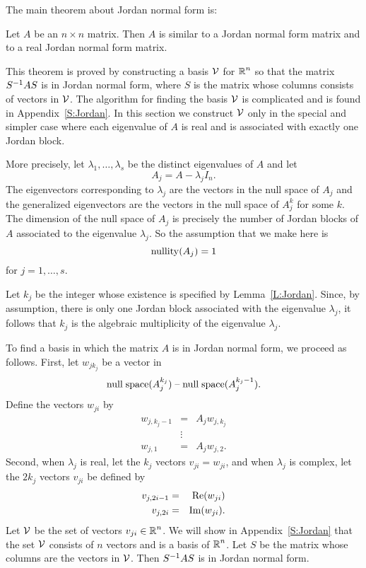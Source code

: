 \documentclass{ximera}
\begin{document}
The main theorem about Jordan normal form is:
\begin{theorem} \label{T:Jordan}
Let $A$ be an $n\times n$ matrix.  Then $A$ is 
similar to a Jordan normal
form matrix and to a real Jordan normal form matrix.
\end{theorem}

This theorem is proved by constructing a basis ${\cal V}$ for $\mbox{$\Bbb{R}$}^n$ so 
that the matrix $S^{-1} AS$ is in Jordan normal form, where $S$ is the
matrix whose columns consists of vectors in ${\cal V}$.  The algorithm for 
finding the basis ${\cal V}$ is complicated and is found in 
Appendix~\ref{S:Jordan}.  In this section we construct ${\cal V}$ only in the 
special and simpler case where each eigenvalue of $A$ is real and is 
associated with exactly one Jordan block.

More precisely, let $\lambda_1,\ldots,\lambda_s$ be the distinct 
eigenvalues of $A$ and let 
\[
A_j = A-\lambda_jI_n.
\]   
The eigenvectors corresponding to $\lambda_j$ are the vectors in the
null space of $A_j$ and the 
generalized eigenvectors are the vectors in 
the null space of $A_j^k$ for some $k$.  The dimension of the null space 
of $A_j$ is precisely the number of Jordan blocks 
of $A$ associated to 
the eigenvalue $\lambda_j$.  So the assumption that we make here is 
\[
{\rm nullity}(A_j) = 1
\]
for $j = 1,\ldots,s$.

Let $k_j$ be the integer whose existence is specified by
Lemma~\ref{L:Jordan}.  Since, by assumption, there is only one Jordan block
associated with the eigenvalue $\lambda_j$, it follows that $k_j$ is the
algebraic multiplicity of the eigenvalue $\lambda_j$.

To find a basis in which the matrix $A$ is in Jordan normal 
form, we proceed as follows.  First, let 
$w_{jk_j}$ be a vector in 
\[
{\rm null\;space}(A_j^{k_j})\;\mbox{--}\;{\rm null\;space}(A_j^{k_j-1}).  
\]  
Define the vectors $w_{ji}$ by 
\begin{eqnarray*}
w_{j,k_j-1} & = & A_jw_{j,k_j} \\
& \vdots &  \\
w_{j,1} & = & A_jw_{j,2}.
\end{eqnarray*}
Second, when $\lambda_j$ is real, let the $k_j$ vectors $v_{ji}=w_{ji}$, and
when $\lambda_j$ is complex, let the $2k_j$ vectors $v_{ji}$ be defined by 
\begin{eqnarray*}
v_{j,2i-1} & = & {\rm Re}(w_{ji})\\
v_{j,2i} & = & {\rm Im}(w_{ji}). 
\end{eqnarray*}
Let ${\cal V}$ be the set of vectors $v_{ji}\in\mbox{$\Bbb{R}$}^n$.   We will show in
Appendix~\ref{S:Jordan} that the set ${\cal V}$ consists of $n$ vectors and 
is a basis of $\mbox{$\Bbb{R}$}^n$.  Let $S$ be the matrix whose columns are the
vectors in ${\cal V}$.  Then $S^{-1} AS$ is in Jordan normal form.
\end{document}
